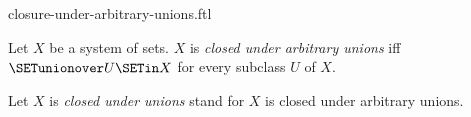 \documentclass{naproche-library}
\begin{document}
\begin{smodule}[title=Closure Under Arbitrary Unions]{closure-under-arbitrary-unions.ftl}

\begin{definition}[forthel,id=FOUNDATIONS_14_3959378992431104]
  Let $X$ be a system of sets.
  $X$ is \emph{closed under arbitrary unions} iff $\SETunionover U \SETin X$ for every  subclass $U$ of $X$.

  Let $X$ is \emph{closed under unions} stand for $X$ is closed under arbitrary unions.
\end{definition}
\end{smodule}
\end{document}
